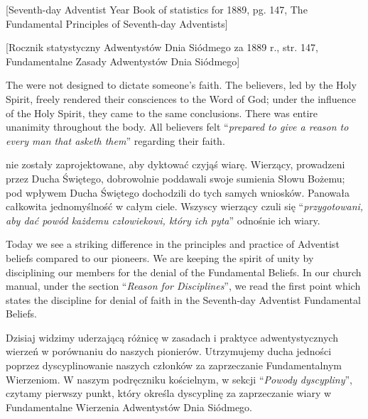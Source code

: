 [Seventh-day Adventist Year Book of statistics for 1889, pg. 147, The Fundamental Principles of Seventh-day Adventists]


[Rocznik statystyczny Adwentystów Dnia Siódmego za 1889 r., str. 147, Fundamentalne Zasady Adwentystów Dnia Siódmego]


The  were not designed to dictate someone’s faith. The believers, led by the Holy Spirit, freely rendered their consciences to the Word of God; under the influence of the Holy Spirit, they came to the same conclusions. There was entire unanimity throughout the body. All believers felt “\textit{prepared to give a reason to every man that asketh them}” regarding their faith.


 nie zostały zaprojektowane, aby dyktować czyjąś wiarę. Wierzący, prowadzeni przez Ducha Świętego, dobrowolnie poddawali swoje sumienia Słowu Bożemu; pod wpływem Ducha Świętego dochodzili do tych samych wniosków. Panowała całkowita jednomyślność w całym ciele. Wszyscy wierzący czuli się “\textit{przygotowani, aby dać powód każdemu człowiekowi, który ich pyta}” odnośnie ich wiary.


Today we see a striking difference in the principles and practice of Adventist beliefs compared to our pioneers. We are keeping the spirit of unity by disciplining our members for the denial of the Fundamental Beliefs. In our church manual, under the section “\textit{Reason for Disciplines}”, we read the first point which states the discipline for denial of faith in the Seventh-day Adventist Fundamental Beliefs.


Dzisiaj widzimy uderzającą różnicę w zasadach i praktyce adwentystycznych wierzeń w porównaniu do naszych pionierów. Utrzymujemy ducha jedności poprzez dyscyplinowanie naszych członków za zaprzeczanie Fundamentalnym Wierzeniom. W naszym podręczniku kościelnym, w sekcji “\textit{Powody dyscypliny}”, czytamy pierwszy punkt, który określa dyscyplinę za zaprzeczanie wiary w Fundamentalne Wierzenia Adwentystów Dnia Siódmego.


